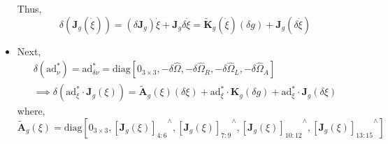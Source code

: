 \documentclass[10pt]{article}
\newcommand{\ad}{\ensuremath{\mathrm{ad}}}
\begin{document}
\begin{itemize}
Thus,
\begin{equation*}
	\delta (\mathbf{J}_g(\dot \xi)) = (\delta \mathbf{J}_g) \dot{\xi} + \mathbf{J}_g \delta \dot{\xi} = \tilde{\mathbf{K}}_g (\dot{\xi}) (\delta g) + \mathbf{J}_g (\delta \dot{\xi})
\end{equation*}

\item  Next,
\begin{align*}
	\delta (\mathrm{ad}^*_\nu)  = 	\mathrm{ad}^*_{\delta \nu} = \mathrm{diag}[0_{3\times 3}, -\delta\hat\Omega, -\delta\hat\Omega_R, -\delta\hat\Omega_L, - \delta\hat\Omega_A] \\
	\implies 
	\delta (\ad^*_\xi \cdot \mathbf{J}_g(\xi)) = \tilde{\mathbf{A}}_g(\xi)(\delta \xi) + \ad^*_\xi \cdot \mathbf{K}_g (\delta g) + \ad^*_\xi \cdot \mathbf{J}_g(\delta \xi)
\end{align*}
where,
\begin{equation} 
\tilde{\mathbf{A}}_g(\xi) = \mathrm{diag}[0_{3\times 3}, {[\mathbf{J}_g(\xi)]_{4:6}}^{\wedge}, {[\mathbf{J}_g(\xi)]_{7:9}}^{\wedge}, {[\mathbf{J}_g(\xi)]_{10:12}}^{\wedge}, {[\mathbf{J}_g(\xi)]_{13:15}}^{\wedge}]
\end{equation}


\end{itemize}
\end{document}
